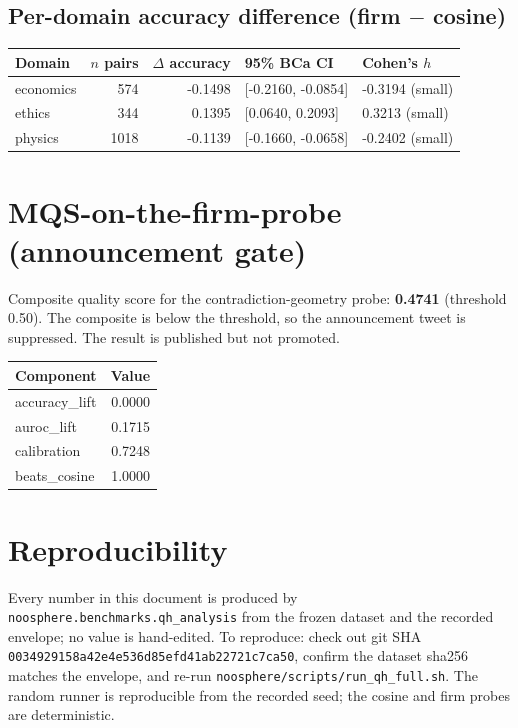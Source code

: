 \documentclass[11pt]{article}
\begin{document}
\subsection{Per-domain accuracy difference (firm $-$ cosine)}
\begin{longtable}{l r r l l}
\toprule
Domain & $n$ pairs & $\Delta$ accuracy & 95\% BCa CI & Cohen's $h$ \\
\midrule
economics & 574 & -0.1498 & [-0.2160, -0.0854] & -0.3194 (small) \\
ethics & 344 & 0.1395 & [0.0640, 0.2093] & 0.3213 (small) \\
physics & 1018 & -0.1139 & [-0.1660, -0.0658] & -0.2402 (small) \\
\bottomrule
\end{longtable}

\section{MQS-on-the-firm-probe (announcement gate)}
Composite quality score for the contradiction-geometry probe: \textbf{0.4741} (threshold 0.50). 
The composite is below the threshold, so the announcement tweet is suppressed. The result is published but not promoted.

\begin{longtable}{l r}
\toprule
Component & Value \\
\midrule
accuracy\_lift & 0.0000 \\
auroc\_lift & 0.1715 \\
calibration & 0.7248 \\
beats\_cosine & 1.0000 \\
\bottomrule
\end{longtable}

\section{Reproducibility}
Every number in this document is produced by \texttt{noosphere.benchmarks.qh\_analysis} from the frozen dataset and the recorded envelope; no value is hand-edited. To reproduce: check out git SHA \texttt{0034929158a42e4e536d85efd41ab22721c7ca50}, confirm the dataset sha256 matches the envelope, and re-run \texttt{noosphere/scripts/run\_qh\_full.sh}. The random runner is reproducible from the recorded seed; the cosine and firm probes are deterministic.
\end{document}
